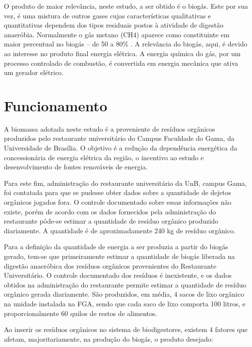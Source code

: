 \par O produto de maior relevância, neste estudo, a ser obtido é o biogás. Este por sua vez, é uma mistura de outros gases cujas características qualitativas e quantitativas dependem dos tipos residuais postos à atividade de digestão anaeróbia. Normalmente o gás metano (CH4) aparece como constituinte em maior percentual no biogás – de 50 a 80\% \cite{texier1979influence}. A relevância do biogás, aqui, é devido ao interesse no produto final energia elétrica. A energia química do gás, por um processo controlado de combustão, é convertida em energia mecânica que ativa um gerador elétrico.

\section {Funcionamento}
A biomassa adotada neste estudo é a proveniente de resíduos orgânicos produzidos pelo restaurante universitário do Campus Faculdade do Gama, da Universidade de Brasília. O objetivo é a redução da dependência energética da concessionária de energia elétrica da região, o incentivo ao estudo e desenvolvimento de fontes renováveis de energia.

Para este fim, administração do restaurante universitário da UnB, campus Gama, foi contatada para que se pudesse obter dados sobre a quantidade de dejetos orgânicos jogados fora. O controle documentado sobre essas informações não existe, porém de acordo com os dados fornecidos pela administração do restaurante pôde-se estimar a quantidade de resíduo orgânico produzido diariamente. A quantidade é de aproximadamente 240 kg de resíduo orgânico.

Para a definição da quantidade de energia a ser produzia a partir do biogás gerado, tem-se que primeiramente estimar a quantidade de biogás liberada na digestão anaeróbica dos resíduos orgânicos provenientes do Restaurante Universitário. O controle documentado dos resíduos é inexistente, e os dados obtidos na administração do restaurante permite estimar a quantidade de resíduo orgânico gerada diariamente.  São produzidos, em média, 4 sacos de lixo orgânico na unidade instalada na FGA, sendo que cada saco de lixo comporta 100 litros, e proporcionalmente 60 quilos de restos de alimentos.                        

Ao inserir os resíduos orgânicos no sistema de biodigestores, existem 4 fatores que afetam, majoritariamente, na produção do biogás, o produto desejado:

